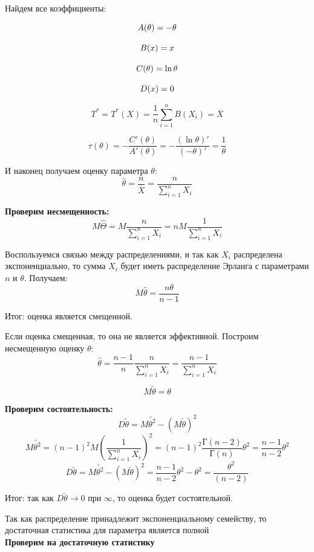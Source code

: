 \documentclass[a4paper,12pt, oneside]{book}
\begin{document}
Найдем все коэффициенты:

$$
A(\theta) = - \theta\\
$$

$$
B(x) = x\\
$$

$$
C(\theta) = \ln\theta\\
$$

$$
D(x) = 0\\
$$ 


$$
T^* = T^*(X) = \frac{1}{n} \sum\limits_{i = 1}^n B(X_i) = \overline{X}
$$

$$
\tau(\theta) = - \dfrac{C'(\theta)}{A'(\theta )}  = -\dfrac{(\ln\theta)'}{(-\theta)'} = \dfrac{1}{\theta}
$$

И наконец получаем оценку параметра $ \theta $:\\
$$
\hat{\theta} = \dfrac{n}{\overline{X}} = \dfrac{n}{\sum\limits_{i = 1}^n X_i}
$$

\textbf{Проверим несмещенность:}
$$
M\hat{\Theta} = M \dfrac{n}{\sum_{i= 1}^{n} X_i} = n M \dfrac{1}{\sum_{i = 1}^{n} X_i}
$$

Воспользуемся связью между распределениями, и так как $ X_i $ распределена экспоненциально, то сумма $ X_i $ будет иметь распределение Эрланга с параметрами $ n  $ и $ \theta $. Получаем:
$$
M\hat{\theta} = \dfrac{n \theta}{n - 1}
$$

Итог: оценка является смещенной.

Если оценка смещенная, то она не является эффективной. Построим несмещенную оценку $ \theta $:
$$
\hat{\theta} = \dfrac{n - 1}{n} \dfrac{n}{\sum_{i = 1}^{n} X_i} = \dfrac{n-1}{\sum_{i = 1}^{n} X_i}
$$

$$
M\tilde{\theta} = \theta 
$$

\textbf{Проверим состоятельность:}
$$
D \tilde{\theta} = M\tilde{\theta ^2}  - (M \tilde{\theta})^2 
$$
$$
M\tilde{\theta ^2} =  (n - 1)^2 M(\dfrac{1}{\sum_{i = 1}^{n}X_i})^2 = (n-1)^2 \dfrac{Г(n - 2)}{Г(n)} \theta^2 = \dfrac{n - 1}{n -2 }\theta^2
$$
$$
D \tilde{\theta} = M\tilde{\theta ^2}  - (M \tilde{\theta})^2  = \dfrac{n - 1}{n -2}\theta^2 - \theta^2 = \dfrac{\theta^2}{(n - 2)}
$$

Итог: так как $ D\tilde{\theta} \rightarrow 0 \text{ при }  \infty$, то оценка будет состоятельной.

Так как распределение принадлежит экспоненциальному семейству, то достаточная статистика для параметра является полной\\

\textbf{Проверим на достаточную статистику}
\end{document}
